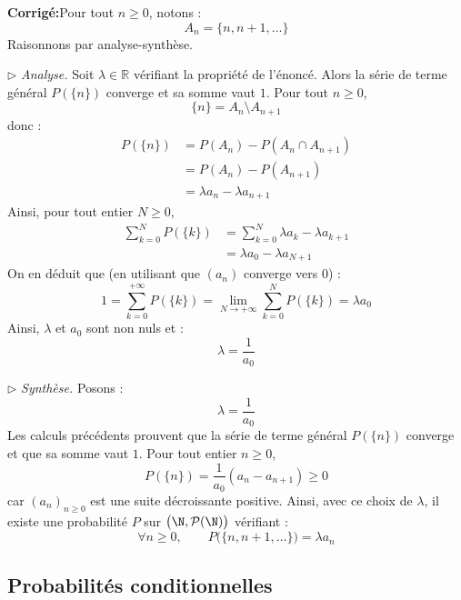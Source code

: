 \documentclass[a4paper,twoside,french,10pt]{VcCours}
\newcommand{\corr}{\textbf{Corrigé:}}
\begin{document}
\corr Pour tout $n \geq 0$, notons :
$$ A_n = \lbrace n, n+1, \ldots \rbrace$$
Raisonnons par analyse-synthèse.



\noindent $\rhd$ \textit{Analyse.} Soit $\lambda \in \mathbb{R}$ vérifiant la propriété de l'énoncé. Alors la série de terme général $P (\lbrace n \rbrace)$ converge et sa somme vaut $1$. Pour tout $n \geq 0$,
$$ \lbrace n \rbrace = A_n \setminus A_{n+1}$$
donc :
\begin{align*}
 P (\lbrace n \rbrace) & = P (A_n) - P (A_n \cap A_{n+1}) \\
 & = P (A_n) - P (A_{n+1}) \\
 & = \lambda a_n - \lambda a_{n+1}
 \end{align*}
Ainsi, pour tout entier $N \geq 0$,
\begin{align*}
\sum_{k=0}^N  P (\lbrace k \rbrace) & = \sum_{k=0}^N\lambda a_k - \lambda a_{k+1} \\
& = \lambda a_0 - \lambda a_{N+1} 
\end{align*}
On en déduit que (en utilisant que $(a_n)$ converge vers $0$) :
$$ 1 = \sum_{k=0}^{+ \infty}  P (\lbrace k \rbrace) = \lim_{N \rightarrow + \infty} \sum_{k=0}^N  P (\lbrace k \rbrace) = \lambda a_0$$
Ainsi, $\lambda$ et $a_0$ sont non nuls et :
$$ \lambda = \dfrac{1}{a_0}$$



\noindent $\rhd$ \textit{Synthèse.} Posons :
$$ \lambda = \dfrac{1}{a_0}$$
Les calculs précédents prouvent que la série de terme général $P( \lbrace n \rbrace)$ converge et que sa somme vaut $1$. Pour tout entier $n \geq 0$,
$$ P( \lbrace n \rbrace) = \dfrac{1}{a_0} (a_n - a_{n+1}) \geq 0$$
car $(a_n)_{n \geq 0}$ est une suite décroissante positive. Ainsi, avec ce choix de $\lambda$, il existe une probabilité $P$ sur $\bigl(\N,\mathcal{P}(\N)\bigr)$ vérifiant :
    \[
    \forall n \geq 0, \qquad P\bigl( \lbrace n, n+1, \ldots \rbrace) = \lambda a_n
    \]
    


\newpage



\subsection{Probabilités conditionnelles}
\end{document}
